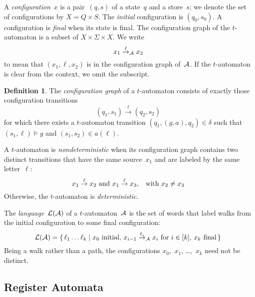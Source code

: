 \documentclass{article} %
\theoremstyle{definition}
\newtheorem{definition}{Definition}
\theoremstyle{remark}
\begin{document}
A \emph{configuration}~$x$ is a pair~$(q,s)$ of a state~$q$ and a store~$s$;
we denote the set of configurations by $X=Q\times S$.
The \emph{initial} configuration is $(q_0,s_0)$.
A configuration is \emph{final} when its state is final.
The configuration graph of the $t$-automaton is a subset of $X\times\Sigma\times X$.
We write \[x_1\stackrel{\ell}{\to}_{\cal A}x_2\] to mean that $(x_1,\ell,x_2)$ is in the configuration graph of~${\cal A}$.
If the $t$-automaton is clear from the context, we omit the subscript.

\begin{definition}\label{def:cgraph}
The \emph{configuration graph} of a $t$-automaton consists of exactly those configuration transitions \[ (q_1,s_1) \stackrel{\ell}{\to} (q_2,s_2) \] for which there exists a $t$-automaton transition $(q_1,(g,a),q_2)\in\delta$ such that $(s_1,\ell)\models g$ and $(s_1,s_2)\in a(\ell)$.
\end{definition}
A $t$-automaton is \emph{nondeterministic} when its configuration graph contains two distinct transitions that have the same source~$x_1$ and are labeled by the same letter~$\ell$:
\[ \text{$x_1\stackrel\ell\to x_2$ and $x_1\stackrel\ell\to x_3$,\quad with $x_2\ne x_3$} \]
Otherwise, the $t$-automaton is \emph{deterministic}.

The \emph{language}~${\cal L}({\cal A})$ of a $t$-automaton~${\cal A}$ is the set of words that label walks from the initial configuration to some final configuration:
\[ {\cal L}({\cal A}) =
  \{\,\ell_1\ldots\ell_k\mid \text{$x_0$ initial,
  $x_{i-1}\stackrel{\ell_i}\to_{\cal A} x_i$ for $i\in[k]$,
  $x_k$ final}\,\}\]
Being a walk rather than a path, the configurations $x_0$,~$x_1$, \dots,~$x_k$ need not be distinct.

\subsection{Register Automata}
\end{document}
